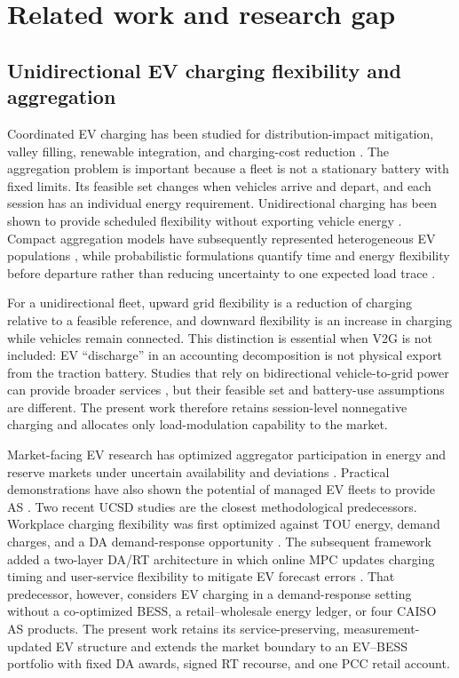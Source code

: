 \documentclass[final,5p,times]{elsarticle}
\begin{document}
\section{Related work and research gap}
\label{sec:literature}
\label{sec:related_work}

\subsection{Unidirectional EV charging flexibility and aggregation}
Coordinated EV charging has been studied for distribution-impact mitigation, valley filling, renewable integration, and charging-cost reduction \cite{clement2010impact} \cite{sortomme2011optimal} \cite{gan2013optimal} \cite{richardson2013electric}. The aggregation problem is important because a fleet is not a stationary battery with fixed limits. Its feasible set changes when vehicles arrive and depart, and each session has an individual energy requirement. Unidirectional charging has been shown to provide scheduled flexibility without exporting vehicle energy \cite{sortomme2011optimal}. Compact aggregation models have subsequently represented heterogeneous EV populations \cite{zheng2013aggregation} \cite{nazari2022updated} \cite{alTaha2025aggregateFlex}, while probabilistic formulations quantify time and energy flexibility before departure rather than reducing uncertainty to one expected load trace \cite{huber2020probabilistic}.

For a unidirectional fleet, upward grid flexibility is a reduction of charging relative to a feasible reference, and downward flexibility is an increase in charging while vehicles remain connected. This distinction is essential when V2G is not included: EV ``discharge'' in an accounting decomposition is not physical export from the traction battery. Studies that rely on bidirectional vehicle-to-grid power can provide broader services \cite{sortomme2012v2gAncillary} \cite{clairand2020ancillary}, but their feasible set and battery-use assumptions are different. The present work therefore retains session-level nonnegative charging and allocates only load-modulation capability to the market.

Market-facing EV research has optimized aggregator participation in energy and reserve markets under uncertain availability and deviations \cite{vagropoulos2013optimal} \cite{bessa2014optimization}. Practical demonstrations have also shown the potential of managed EV fleets to provide AS \cite{deforest2018lafb}. Two recent UCSD studies are the closest methodological predecessors. Workplace charging flexibility was first optimized against TOU energy, demand charges, and a DA demand-response opportunity \cite{chen2024costoptimal}. The subsequent framework added a two-layer DA/RT architecture in which online MPC updates charging timing and user-service flexibility to mitigate EV forecast errors \cite{chen2026realtime}. That predecessor, however, considers EV charging in a demand-response setting without a co-optimized BESS, a retail--wholesale energy ledger, or four CAISO AS products. The present work retains its service-preserving, measurement-updated EV structure and extends the market boundary to an EV--BESS portfolio with fixed DA awards, signed RT recourse, and one PCC retail account.
\end{document}
